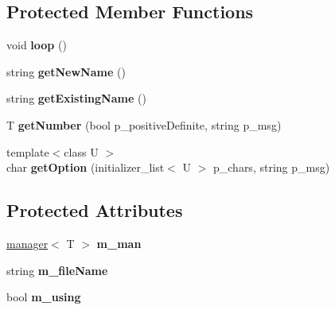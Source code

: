 \subsection*{Protected Member Functions}
\begin{DoxyCompactItemize}
\item 
\hypertarget{classpolygons_1_1app_ad8953bfb86943eb52851971a786d0bf8}{void {\bfseries loop} ()}\label{classpolygons_1_1app_ad8953bfb86943eb52851971a786d0bf8}

\item 
\hypertarget{classpolygons_1_1app_a54b9b363ea71f6a0df9936a5498e05d5}{string {\bfseries get\-New\-Name} ()}\label{classpolygons_1_1app_a54b9b363ea71f6a0df9936a5498e05d5}

\item 
\hypertarget{classpolygons_1_1app_a685b0431705cfa698fbcf15112694a36}{string {\bfseries get\-Existing\-Name} ()}\label{classpolygons_1_1app_a685b0431705cfa698fbcf15112694a36}

\item 
\hypertarget{classpolygons_1_1app_a4f9da856aa9944fa104fd63ff86feb40}{T {\bfseries get\-Number} (bool p\-\_\-positive\-Definite, string p\-\_\-msg)}\label{classpolygons_1_1app_a4f9da856aa9944fa104fd63ff86feb40}

\item 
\hypertarget{classpolygons_1_1app_a2e559bc56e3dc8aecc344ddfe6a15388}{{\footnotesize template$<$class U $>$ }\\char {\bfseries get\-Option} (initializer\-\_\-list$<$ U $>$ p\-\_\-chars, string p\-\_\-msg)}\label{classpolygons_1_1app_a2e559bc56e3dc8aecc344ddfe6a15388}

\end{DoxyCompactItemize}
\subsection*{Protected Attributes}
\begin{DoxyCompactItemize}
\item 
\hypertarget{classpolygons_1_1app_a9a23bbc7fcd63799c4519c13616285f7}{\hyperlink{classpolygons_1_1manager}{manager}$<$ T $>$ {\bfseries m\-\_\-man}}\label{classpolygons_1_1app_a9a23bbc7fcd63799c4519c13616285f7}

\item 
\hypertarget{classpolygons_1_1app_a0ed33f611d56816f2cad442968e73c8b}{string {\bfseries m\-\_\-file\-Name}}\label{classpolygons_1_1app_a0ed33f611d56816f2cad442968e73c8b}

\item 
\hypertarget{classpolygons_1_1app_a19a74b237359a316270424bac4a82065}{bool {\bfseries m\-\_\-using}}\label{classpolygons_1_1app_a19a74b237359a316270424bac4a82065}

\end{DoxyCompactItemize}


